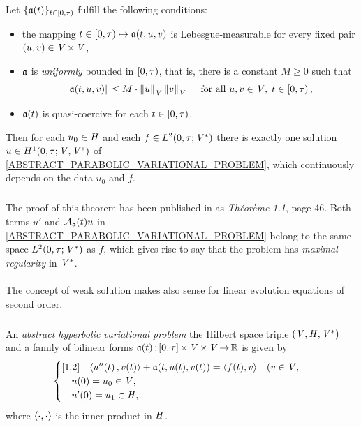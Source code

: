 \documentclass[11pt,twoside]{article}
\begin{document}
\begin{theorem}\label{LIONS_THEOREM_I}
Let $\{\mathfrak{a}(t)\}_{t \in [0,\tau)}$ fulfill the following conditions:

\begin{itemize}[leftmargin=9mm]
\item[(a)]
the mapping $t \in [0,\tau) \mapsto \mathfrak{a}(t,u,v)$ is Lebesgue-measurable
for every fixed pair $(u,v) \in \mathit{V} {\,\times\,} \mathit{V}$,

\item[(b)]
$\mathfrak{a}$ is \textit{uniformly} bounded in $[0,\tau)$,
that is,
there is a constant $M \geq 0$ such that
\[
\abs{\sql(t,u,v)} \, \leq M \cdot \norm{u}_{\vecV} \norm{v}_{\vecV}
\qfa u,v \in \vecV, \; t \in [0,\T)\,,
\]
\item[(c)]
$\mathfrak{a}(t)$ is quasi-coercive for each $t \in [0,\tau)$.
\end{itemize}

Then for each $u_0 \in \mathit{H}$ and each $f \in L^2(0,\tau;\mathit{V}^*)$
there is exactly one solution $u \in H^1(0,\tau;\mathit{V},\mathit{V}^*)$
of \eqref{ABSTRACT_PARABOLIC_VARIATIONAL_PROBLEM},
which continuously depends on the data $u_0$ and $f$.
\end{theorem}

\subparagraph*{}
The proof of this theorem has been published in \cite{Li2}
as \textit{Th\'{e}or\`{e}me 1.1}, page 46.
Both terms $u'$ and ${{\mathcal{A}}_{\mathfrak{a}}}(t) u$
in \eqref{ABSTRACT_PARABOLIC_VARIATIONAL_PROBLEM}
belong to the same space $L^2(0,\tau;\mathit{V}^*)$ as $f$,
which gives rise to say
that the problem has \textit{maximal regularity} in $\mathit{V}^*$.

\paragraph*{} %
The concept of weak solution makes also sense
for linear evolution equations of second order.

\subparagraph*{}
An \textit{abstract hyperbolic variational problem}
{\wrt} the Hilbert space triple $(\mathit{V},\mathit{H},\mathit{V}^*)$ 
and a family of bilinear forms
$\mathfrak{a}(t){\,:\,}[0,\tau] {\,\times\,} \mathit{V} {\,\times\,} \mathit{V} {\,\to\,} {\mathbb{R}}$ is given by
\begin{equation}\label{ABSTRACT_HYPERBOLIC_VARIATIONAL_PROBLEM}
\begin{cases}[1.2]
\quad \langle u''(t)\,,v(t) \rangle + \mathfrak{a}(t,u(t),v(t)) = \langle f(t),v \rangle 
\quad (v \in \mathit{V}, \\
\quad u(0)  = u_0 \in \mathit{V}, \\
\quad u'(0) = u_1 \in \mathit{H}, \\
\end{cases}
\end{equation}
where $\langle \cdot,\cdot \rangle$ is the inner product in $\mathit{H}$.
\end{document}
